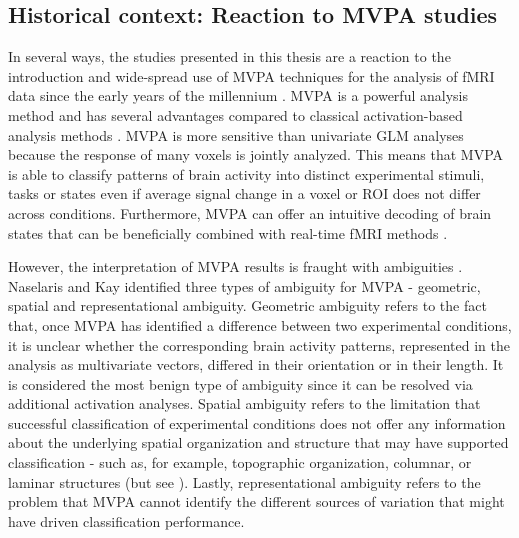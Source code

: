 \subsection{Historical context: Reaction to MVPA studies}
In several ways, the studies presented in this thesis are a reaction to the introduction and wide-spread use of MVPA techniques for the analysis of fMRI data since the early years of the millennium \parencite{Haxby2014}. MVPA is a powerful analysis method and has several advantages compared to classical activation-based analysis methods \parencite{Mur2009}. MVPA is more sensitive than univariate GLM analyses because the response of many voxels is jointly analyzed. This means that MVPA is able to classify patterns of brain activity into distinct experimental stimuli, tasks or states even if average signal change in a voxel or ROI does not differ across conditions. Furthermore, MVPA can offer an intuitive decoding of brain states that can be beneficially combined with real-time fMRI methods \parencite{LaConte2007}.

However, the interpretation of MVPA results is fraught with ambiguities \parencite{Bartels2008, Logothetis2008, Wang2014, Naselaris2015a}. Naselaris and Kay \parencite*{Naselaris2015a} identified three types of ambiguity for MVPA - geometric, spatial and representational ambiguity. Geometric ambiguity refers to the fact that, once MVPA has identified a difference between two experimental conditions, it is unclear whether the corresponding brain activity patterns, represented in the analysis as multivariate vectors, differed in their orientation or in their length. It is considered the most benign type of ambiguity since it can be resolved via additional activation analyses. Spatial ambiguity refers to the limitation that successful classification of experimental conditions does not offer any information about the underlying spatial organization and structure that may have supported classification - such as, for example, topographic organization, columnar, or laminar structures (but see \cite{Kriegeskorte2006}). Lastly, representational ambiguity refers to the problem that MVPA cannot identify the different sources of variation that might have driven classification performance.

